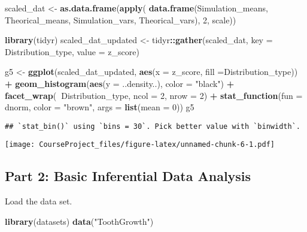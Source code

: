 \documentclass[]{article}
\newenvironment{Shaded}{\begin{snugshade}}{\end{snugshade}}
\newcommand{\KeywordTok}[1]{\textcolor[rgb]{0.13,0.29,0.53}{\textbf{#1}}}
\newcommand{\DataTypeTok}[1]{\textcolor[rgb]{0.13,0.29,0.53}{#1}}
\newcommand{\DecValTok}[1]{\textcolor[rgb]{0.00,0.00,0.81}{#1}}
\newcommand{\StringTok}[1]{\textcolor[rgb]{0.31,0.60,0.02}{#1}}
\newcommand{\OperatorTok}[1]{\textcolor[rgb]{0.81,0.36,0.00}{\textbf{#1}}}
\newcommand{\NormalTok}[1]{#1}
\begin{document}
\begin{Shaded}
\begin{Highlighting}[]
\NormalTok{scaled_dat <-}\StringTok{ }\KeywordTok{as.data.frame}\NormalTok{(}\KeywordTok{apply}\NormalTok{(}
  \KeywordTok{data.frame}\NormalTok{(Simulation_means, Theorical_means, Simulation_vars, Theorical_vars), }
  \DecValTok{2}\NormalTok{, scale))}

\KeywordTok{library}\NormalTok{(tidyr)}
\NormalTok{scaled_dat_updated <-}\StringTok{ }\NormalTok{tidyr}\OperatorTok{::}\KeywordTok{gather}\NormalTok{(scaled_dat, }\DataTypeTok{key =}\NormalTok{ Distribution_type, }\DataTypeTok{value =}\NormalTok{ z_score)}

\NormalTok{g5 <-}\StringTok{ }\KeywordTok{ggplot}\NormalTok{(scaled_dat_updated, }\KeywordTok{aes}\NormalTok{(}\DataTypeTok{x =}\NormalTok{ z_score, }\DataTypeTok{fill =}\NormalTok{Distribution_type)) }\OperatorTok{+}
\StringTok{  }\KeywordTok{geom_histogram}\NormalTok{(}\KeywordTok{aes}\NormalTok{(}\DataTypeTok{y =}\NormalTok{ ..density..), }\DataTypeTok{color =} \StringTok{"black"}\NormalTok{) }\OperatorTok{+}
\StringTok{  }\KeywordTok{facet_wrap}\NormalTok{(}\OperatorTok{~}\NormalTok{Distribution_type, }\DataTypeTok{ncol =} \DecValTok{2}\NormalTok{, }\DataTypeTok{nrow =} \DecValTok{2}\NormalTok{) }\OperatorTok{+}
\StringTok{  }\KeywordTok{stat_function}\NormalTok{(}\DataTypeTok{fun =}\NormalTok{ dnorm, }\DataTypeTok{color =} \StringTok{"brown"}\NormalTok{, }\DataTypeTok{args =} \KeywordTok{list}\NormalTok{(}\DataTypeTok{mean =} \DecValTok{0}\NormalTok{))}
\NormalTok{g5}
\end{Highlighting}
\end{Shaded}

\begin{verbatim}
## `stat_bin()` using `bins = 30`. Pick better value with `binwidth`.
\end{verbatim}

\texttt{[image: CourseProject\_files/figure-latex/unnamed-chunk-6-1.pdf]}

\subsection{Part 2: Basic Inferential Data
Analysis}\label{part-2-basic-inferential-data-analysis}

Load the data set.

\begin{Shaded}
\begin{Highlighting}[]
\KeywordTok{library}\NormalTok{(datasets)}
\KeywordTok{data}\NormalTok{(}\StringTok{"ToothGrowth"}\NormalTok{)}
\end{Highlighting}
\end{Shaded}
\end{document}
